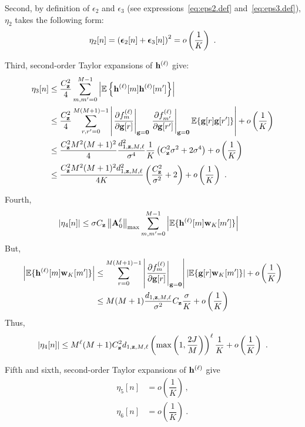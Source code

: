 \documentclass[journal,onecolumn]{IEEEtran}
\begin{document}
Second, by definition of $\epsilon_2$ and $\epsilon_3$ (see expressions~\eqref{eq:eps2.def} and~\eqref{eq:eps3.def}), $\eta_2$ takes the following form:
\begin{equation}
\eta_2[n] = \left(\bepsilon_2[n]+\bepsilon_3[n]\right)^2 = o\left(\dfrac1K\right)\ .
\label{eq:sum2}
\end{equation}

Third, second-order Taylor expansions of ${\mathbf h}^{(\ell)}$ give:
\begin{align}
\nonumber
\eta_3[n] &\leq
\dfrac{C_\bz^2}{4}\sum_{m,m'=0}^{M-1}\left|\EE\left\{\bh^{(\ell)}[m]\bh^{(\ell)}[m']\right\}\right| \\
\nonumber
&\leq \dfrac{C_\bz^2}{4} \sum_{r,r'=0}^{M(M+1)-1}\left|\left.\dfrac{\partial f_m^{(\ell)}}{\partial \bg[r]}\right\vert_{\bg=\bzero}\left.\dfrac{\partial f_{m'}^{(\ell)}}{\partial \bg[r']}\right\vert_{\bg=\bzero} \EE\{\bg[r]\bg[r']\}\right| + o\left(\dfrac1K\right) \\
\nonumber
&\leq \dfrac{C_\bz^2 M^2(M+1)^2}{4}  \dfrac{d_{1,\bz,M,\ell}^2}{\sigma^4}\dfrac1K \left( C_\bz^2\sigma^2 + 2 \sigma^4\right) + o\left(\dfrac1K\right) \\
&\leq \dfrac{C_\bz^2 M^2(M+1)^2d_{1,\bz,M,\ell}^2}{4K} \left( \dfrac{C_\bz^2}{\sigma^2} + 2\right)  + o\left(\dfrac1K\right)\ .
\label{eq:sum3}
\end{align}

Fourth,
\begin{align*}
\left|\eta_4[n]\right| & \leq \sigma C_{\mathbf z}\left\|{\mathbf A}_0^{\ell}\right\|_{\max} \sum_{m,m'=0}^{M-1}\left|{\mathbb E}\{{\mathbf h}^{(\ell)}[m]{\mathbf w}_K[m']\} \right|
\end{align*}
But,
\begin{align}
\nonumber
\left|\EE\{\bh^{(\ell)}[m]\bw_K[m']\} \right|  &\leq \sum_{r=0}^{M(M+1)-1}\left|\left.\dfrac{\partial f_m^{(\ell)}}{\partial \bg[r]}\right\vert_{\bg=\bzero}\right| \left|\EE\{\bg[r]\bw_K[m']\}\right| + o\left(\dfrac1K\right) \\
&\leq M(M+1)\dfrac{d_{1,\bz,M,\ell}}{\sigma^2} C_\bz\dfrac{\sigma}{K} + o\left(\dfrac1K\right)
\label{eq:Ehwm}
\end{align}
Thus,
\begin{equation}
\left|\eta_4[n]\right| \leq M^\ell(M+1)C_\bz^2 d_{1,\bz,M,\ell}\left(\max\left(1,\frac{2J}{M}\right)\right)^\ell\dfrac{1}{K} + o\left(\dfrac1K\right)\ .
\label{eq:sum4}
\end{equation}

Fifth and sixth, second-order Taylor expansions of ${\mathbf h}^{(\ell)}$ give
\begin{align}
\label{eq:sum5}
\eta_5[n] &= o\left(\dfrac1K\right)\,, \\
\label{eq:sum6}
\eta_6[n] &= o\left(\dfrac1K\right)\ .
\end{align}
\end{document}
